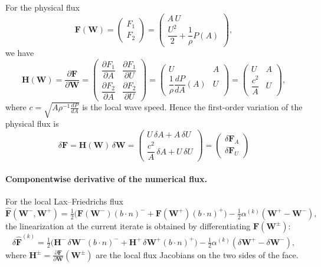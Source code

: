 \documentclass[11pt]{article}
\begin{document}
For the physical flux
\[
  \mathbf{F}(\mathbf{W}) =
  \begin{pmatrix}
    F_1 \\[1mm] F_2
  \end{pmatrix}
  =
  \begin{pmatrix}
    A\,U \\[1mm]
    \dfrac{U^2}{2} + \dfrac{1}{\rho}P(A)
  \end{pmatrix},
\]
we have
\[
  \mathbf{H}(\mathbf{W})
  = \frac{\partial\mathbf{F}}{\partial\mathbf{W}}
  =
  \begin{pmatrix}
    \dfrac{\partial F_1}{\partial A} &
    \dfrac{\partial F_1}{\partial U} \\[2mm]
    \dfrac{\partial F_2}{\partial A} &
    \dfrac{\partial F_2}{\partial U}
  \end{pmatrix}
  =
  \begin{pmatrix}
    U & A \\[2mm]
    \dfrac{1}{\rho}\dfrac{dP}{dA}(A) & U
  \end{pmatrix}
  =
  \begin{pmatrix}
    U & A \\[2mm]
    \dfrac{c^2}{A} & U
  \end{pmatrix},
\]
where $c=\sqrt{A\rho^{-1}\frac{dP}{dA}}$ is the local wave speed.
Hence the first-order variation of the physical flux is
\[
  \delta\mathbf{F}
  = \mathbf{H}(\mathbf{W})\,\delta\mathbf{W}
  =
  \begin{pmatrix}
   U\,\delta A + A\,\delta U \\[1mm]
    \dfrac{c^2}{A}\,\delta A + U\,\delta U
  \end{pmatrix}  = \begin{pmatrix}
      \delta\mathbf{F}_A \\[1mm]
      \delta\mathbf{F}_U
  \end{pmatrix}
\]

\vspace{0.5em}
\paragraph{Componentwise derivative of the numerical flux.}

For the local Lax--Friedrichs flux
\[
  \widehat{\mathbf{F}}(\mathbf{W}^-,\mathbf{W}^+)
  =
  \tfrac{1}{2}\big(\mathbf{F}(\mathbf{W}^-)(b \cdot n)^{-}+\mathbf{F}(\mathbf{W}^+)(b \cdot n)^{+}\big)
  -\tfrac{1}{2}\alpha^{(k)}(\mathbf{W}^+ - \mathbf{W}^-),
\]
the linearization at the current iterate is obtained by differentiating
$\mathbf{F}(\mathbf{W}^\pm)$:
\begin{equation}\label{eq:LF-derivative-component}
  \boxed{
  \delta\widehat{\mathbf{F}}^{(k)}
  =
  \tfrac{1}{2}
  \big(
    \mathbf{H}^-\,\delta\mathbf{W}^- (b \cdot n)^{-}
    + \mathbf{H}^+\,\delta\mathbf{W}^+ (b \cdot n)^{+}
  \big)
  - \tfrac{1}{2}\alpha^{(k)}
    (\delta\mathbf{W}^+ - \delta\mathbf{W}^-),
  }
\end{equation}
where $\mathbf{H}^\pm=\tfrac{\partial\mathbf{F}}{\partial\mathbf{W}}(\mathbf{W}^\pm)$
are the local flux Jacobians on the two sides of the face.
\end{document}
